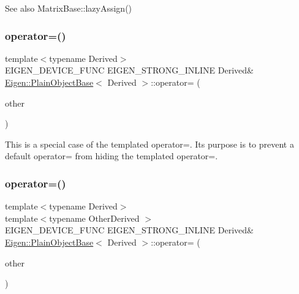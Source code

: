 \begin{DoxySeeAlso}{See also}
Matrix\+Base\+::lazy\+Assign() 
\end{DoxySeeAlso}
\mbox{\label{class_eigen_1_1_plain_object_base_a75308f8a23a03f045a1260611e2054a0}} 
\subsubsection{\texorpdfstring{operator=()}{operator=()}\hspace{0.1cm}{\footnotesize\ttfamily [1/2]}}
{\footnotesize\ttfamily template$<$typename Derived$>$ \\
E\+I\+G\+E\+N\+\_\+\+D\+E\+V\+I\+C\+E\+\_\+\+F\+U\+NC E\+I\+G\+E\+N\+\_\+\+S\+T\+R\+O\+N\+G\+\_\+\+I\+N\+L\+I\+NE Derived\& \mbox{\hyperlink{class_eigen_1_1_plain_object_base}{Eigen\+::\+Plain\+Object\+Base}}$<$ Derived $>$\+::operator= (\begin{DoxyParamCaption}\item[{const \mbox{\hyperlink{class_eigen_1_1_plain_object_base}{Plain\+Object\+Base}}$<$ Derived $>$ \&}]{other }\end{DoxyParamCaption})\hspace{0.3cm}{\ttfamily [inline]}}

This is a special case of the templated operator=. Its purpose is to prevent a default operator= from hiding the templated operator=. \mbox{\label{class_eigen_1_1_plain_object_base_a6d280056e43429f043e8b25262ee6153}} 
\subsubsection{\texorpdfstring{operator=()}{operator=()}\hspace{0.1cm}{\footnotesize\ttfamily [2/2]}}
{\footnotesize\ttfamily template$<$typename Derived$>$ \\
template$<$typename Other\+Derived $>$ \\
E\+I\+G\+E\+N\+\_\+\+D\+E\+V\+I\+C\+E\+\_\+\+F\+U\+NC E\+I\+G\+E\+N\+\_\+\+S\+T\+R\+O\+N\+G\+\_\+\+I\+N\+L\+I\+NE Derived\& \mbox{\hyperlink{class_eigen_1_1_plain_object_base}{Eigen\+::\+Plain\+Object\+Base}}$<$ Derived $>$\+::operator= (\begin{DoxyParamCaption}\item[{const \mbox{\hyperlink{struct_eigen_1_1_eigen_base}{Eigen\+Base}}$<$ Other\+Derived $>$ \&}]{other }\end{DoxyParamCaption})\hspace{0.3cm}{\ttfamily [inline]}}



